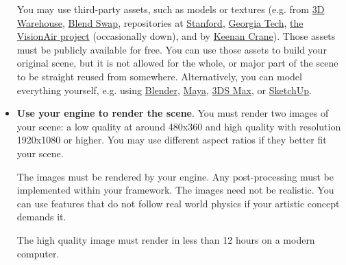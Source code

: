\documentclass[addpoints]{exam}
\begin{document}
\begin{questions}
\begin{itemize}
    You may use third-party assets, such as models or textures (e.g. from \href{https://3dwarehouse.sketchup.com}{3D Warehouse}, \href{https://www.blendswap.com}{Blend Swap}, repositories at \href{http://graphics.stanford.edu/data/3Dscanrep/}{Stanford}, \href{https://www.cc.gatech.edu/projects/large_models/}{Georgia Tech}, \href{http://visionair.ge.imati.cnr.it/ontologies/shapes/viewmodels.jsp}{the VisionAir project} (occasionally down), and by \href{https://www.cs.cmu.edu/~kmcrane/Projects/ModelRepository/}{Keenan Crane}). Those assets must be publicly available for free. You can use those assets to build your original scene, but it is not allowed for the whole, or major part of the scene to be straight reused from somewhere. Alternatively, you can model everything yourself, e.g. using \href{https://www.blender.org}{Blender}, \href{https://www.autodesk.com/products/maya/overview}{Maya}, \href{https://www.autodesk.com/products/3ds-max/overview}{3DS Max}, or \href{https://www.sketchup.com}{SketchUp}.

  \item \textbf{Use your engine to render the scene}. You must render two images of your scene: a low quality at around 480x360 and high quality with resolution 1920x1080 or higher. You may use different aspect ratios if they better fit your scene.
    
    The images must be rendered by your engine. Any post-processing must be implemented within your framework. The images need not be realistic. You can use features that do not follow real world physics if your artistic concept demands it.
    
    The high quality image must render in less than 12 hours on a modern computer.


\end{itemize}
\end{questions}
\end{document}
